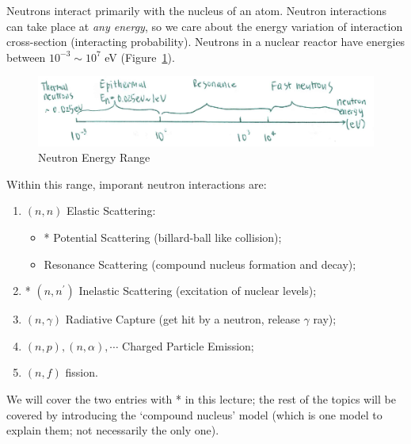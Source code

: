 \documentclass{school-22.101-notes}
\date{November 28, 2011}
\begin{document}
\maketitle

Neutrons interact primarily with the nucleus of an atom. Neutron interactions can take place at \textit{any energy}, so we care about the energy variation of interaction cross-section (interacting probability). Neutrons in a nuclear reactor have energies between $10^{-3} \sim 10^7$ eV (Figure~\ref{neutron-energy}).  
\begin{figure}[ht]
    \centering
    \includegraphics[width=5in]{images/ni/neutron-energy.png}
    \caption{Neutron Energy Range\label{neutron-energy}}
\end{figure}
Within this range, imporant neutron interactions are: 
\begin{enumerate}
\item $(n,n)$ Elastic Scattering: 
    \begin{itemize}
    \item* Potential Scattering (billard-ball like collision);
    \item Resonance Scattering (compound nucleus formation and decay);
    \end{itemize}
\item* $(n,n^{\prime})$ Inelastic Scattering (excitation of nuclear levels);
\item $(n, \gamma)$ Radiative Capture (get hit by a neutron, release $\gamma$ ray);
\item $(n, p), (n,\alpha), \cdots$ Charged Particle Emission;
\item $(n, f)$ fission.     
\end{enumerate}
We will cover the two entries with * in this lecture; the rest of the topics will be covered by introducing the `compound nucleus' model (which is one model to explain them; not necessarily the only one). 
\end{document}
